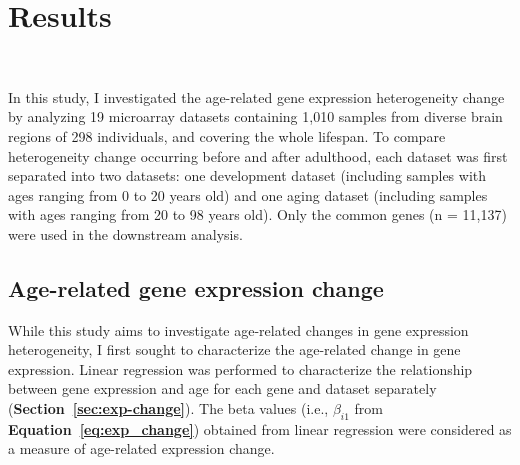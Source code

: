 \chapter{Results}~\label{chp:b3}

In this study, I investigated the age-related gene expression heterogeneity change by analyzing 19 microarray datasets
containing 1,010 samples from diverse brain regions of 298 individuals, and covering the whole lifespan.
To compare heterogeneity change occurring before and after adulthood, each dataset was first separated into two datasets: one development dataset 
(including samples with ages ranging from 0 to 20 years old) and one aging dataset (including samples with ages ranging from 20 to 98 years old).
Only the common genes (n = 11,137) were used in the downstream analysis.

\section{Age-related gene expression change}
While this study aims to investigate age-related changes in gene expression heterogeneity, I first sought to characterize the age-related change in gene expression.
Linear regression was performed to characterize the relationship between gene expression and age for each gene and dataset separately (\textbf{Section~\ref{sec:exp-change}}).
The beta values (i.e., $\beta_{i1}$ from \textbf{Equation~\ref{eq:exp_change}}) obtained from linear regression were considered as a measure of age-related expression change.


